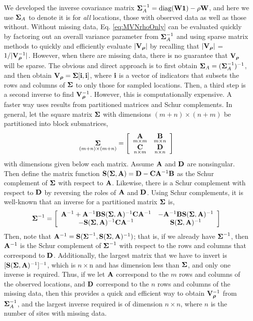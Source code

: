 \documentclass[11pt, titlepage]{article}\usepackage[]{graphicx}\usepackage[]{color}
\begin{document}
We developed the inverse covariance matrix $\mbox{\boldmath $\Sigma$}_A^{-1} = \textrm{diag}(\mathbf{W}\mathbf{1}) - \rho\mathbf{W}$, and here we use $\mbox{\boldmath $\Sigma$}_A$ to denote it is for \emph{all} locations, those with observed data as well as those without. Without missing data, Eq. \ref{eq:MVNrhoOnly} can be evaluated quickly by factoring out an overall variance parameter from $\mbox{\boldmath $\Sigma$}_A^{-1}$ and using sparse matrix methods to quickly and efficiently evaluate $|\mathbf{V}_{{\boldsymbol{\rho}}}|$ by recalling that $|\mathbf{V}_{{\boldsymbol{\rho}}}|$ = $1/|\mathbf{V}^{-1}_{{\boldsymbol{\rho}}}|$.  However, when there are missing data, there is no guarantee that $\mathbf{V}_{{\boldsymbol{\rho}}}$ will be sparse.  The obvious and direct approach is to first obtain $\mbox{\boldmath $\Sigma$}_A = (\mbox{\boldmath $\Sigma$}_A^{-1})^{-1}$, and then obtain $\mathbf{V}_{{\boldsymbol{\rho}}} = \mbox{\boldmath $\Sigma$}[\mathbf{i},\mathbf{i}]$, where $\mathbf{i}$ is a vector of indicators that subsets the rows and columns of $\mbox{\boldmath $\Sigma$}$ to only those for sampled locations.  Then, a third step is a second inverse to find $\mathbf{V}_{{\boldsymbol{\rho}}}^{-1}$.  However, this is computationally expensive.  A faster way uses results from partitioned matrices and Schur complements.  In general, let the square matrix $\mbox{\boldmath $\Sigma$}$ with dimensions $(m + n) \times (n + m)$ be partitioned into block submatrices,
\[
  \underset{(m+n) \times (m+n)}{\mbox{\boldmath $\Sigma$}} = \left[
    \begin{array}{cc}
	    \underset{m \times m}{\mathbf{A}} & \underset{m \times n}{\mathbf{B}} \\
	    \underset{n \times m}{\mathbf{C}} & \underset{n \times n}{\mathbf{D}}
    \end{array}
  \right]
\]
with dimensions given below each matrix. Assume $\mathbf{A}$ and $\mathbf{D}$ are nonsingular.  Then define the matrix function $\mathbf{S}(\mbox{\boldmath $\Sigma$},\mathbf{A}) = \mathbf{D} - \mathbf{C}\mathbf{A}^{-1}\mathbf{B}$ as the Schur complement of $\mbox{\boldmath $\Sigma$}$ with respect to $\mathbf{A}$.  Likewise, there is a Schur complement with respect to $\mathbf{D}$ by reversing the roles of $\mathbf{A}$ and $\mathbf{D}$.  Using Schur complements, it is well-known \citep[e.g.,][p. 97]{Harv:matr:1997} that an inverse for a partitioned matrix $\mbox{\boldmath $\Sigma$}$ is,
\[
  \mbox{\boldmath $\Sigma$}^{-1} = \left[
    \begin{array}{cc}
      \mathbf{A}^{-1} + \mathbf{A}^{-1}\mathbf{B}\mathbf{S}(\mbox{\boldmath $\Sigma$},\mathbf{A})^{-1}\mathbf{C}\mathbf{A}^{-1} & -\mathbf{A}^{-1}\mathbf{B}\mathbf{S}(\mbox{\boldmath $\Sigma$},\mathbf{A})^{-1} \\
      -\mathbf{S}(\mbox{\boldmath $\Sigma$},\mathbf{A})^{-1}\mathbf{C}\mathbf{A}^{-1} & \mathbf{S}(\mbox{\boldmath $\Sigma$},\mathbf{A})^{-1}
    \end{array}
  \right]
\]
Then, note that $\mathbf{A}^{-1} = \mathbf{S}(\mbox{\boldmath $\Sigma$}^{-1}, \mathbf{S}(\mbox{\boldmath $\Sigma$},\mathbf{A})^{-1})$; that is, if we already have $\mbox{\boldmath $\Sigma$}^{-1}$, then $\mathbf{A}^{-1}$ is the Schur complement of $\mbox{\boldmath $\Sigma$}^{-1}$ with respect to the rows and columns that correspond to $\mathbf{D}$.  Additionally, the largest matrix that we have to invert is $[\mathbf{S}(\mbox{\boldmath $\Sigma$},\mathbf{A})^{-1}]^{-1}$, which is $n \times $n and has dimension less than $\mbox{\boldmath $\Sigma$}$, and only one inverse is required. Thus, if we let $\mathbf{A}$ correspond to the $m$ rows and columns of the observed locations, and $\mathbf{D}$ correspond to the $n$ rows and columns of the missing data, then this provides a quick and efficient way to obtain $\mathbf{V}_{{\boldsymbol{\rho}}}^{-1}$ from $\mbox{\boldmath $\Sigma$}_A^{-1}$, and the largest inverse required is of dimension $n \times n$, where $n$ is the number of sites with missing data.
\end{document}
